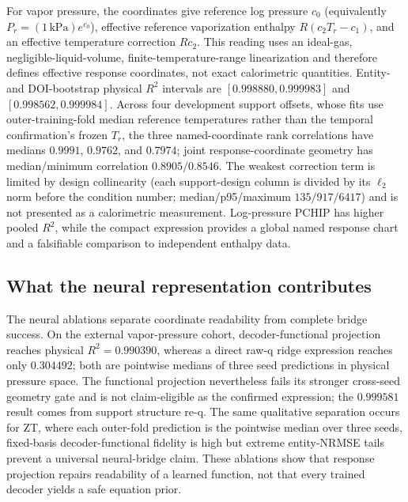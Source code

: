For vapor pressure, the coordinates give reference log pressure $c_0$
(equivalently $P_r=(1\,\mathrm{kPa})e^{c_0}$), effective reference
vaporization enthalpy $R(c_2T_r-c_1)$, and an effective temperature correction
$Rc_2$.  This reading uses an ideal-gas, negligible-liquid-volume,
finite-temperature-range linearization and therefore defines effective response
coordinates, not exact calorimetric quantities.  Entity- and DOI-bootstrap
physical $R^2$ intervals are
$[0.998880,0.999983]$ and $[0.998562,0.999984]$.  Across four development
support offsets, whose fits use outer-training-fold median reference
temperatures rather than the temporal confirmation's frozen $T_r$, the three
named-coordinate rank correlations have medians
$0.9991$, $0.9762$, and $0.7974$; joint response-coordinate geometry has
median/minimum correlation $0.8905/0.8546$.  The weakest correction term is
limited by design collinearity (each support-design column is divided by its
$\ell_2$ norm before the condition number; median/p95/maximum
$135/917/6417$) and is not presented as a calorimetric measurement.  Log-pressure PCHIP has
higher pooled $R^2$, while the compact expression provides a global named
response chart and a falsifiable comparison to independent enthalpy data.

\subsection{What the neural representation contributes}

The neural ablations separate coordinate readability from complete bridge
success.  On the external vapor-pressure cohort, decoder-functional projection
reaches physical $R^2=0.990390$, whereas a direct raw-q ridge expression reaches
only $0.304492$; both are pointwise medians of three seed predictions in physical
pressure space.  The functional projection nevertheless fails its stronger
cross-seed geometry gate and is not claim-eligible as the confirmed expression;
the $0.999581$ result comes from support structure re-q.  The same qualitative
separation occurs for ZT, where each outer-fold prediction is the pointwise
median over three seeds, fixed-basis decoder-functional fidelity is high
but extreme entity-NRMSE tails prevent a universal neural-bridge claim.  These
ablations show that response projection repairs readability of a learned
function, not that every trained decoder yields a safe equation prior.

